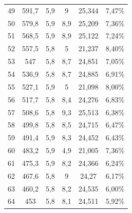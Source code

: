 \begin{longtable}{cccccc}
  49          & 591,7                & 5,9           & 9              & 25,344        & 7,47\%                             \\
  50          & 579,8                & 5,9           & 8,9            & 25,209        & 7,36\%                             \\
  51          & 568,5                & 5,9           & 8,9            & 25,122        & 7,24\%                             \\
  52          & 557,5                & 5,8           & 5              & 21,237        & 8,40\%                             \\
  53          & 547                  & 5,8           & 8,7            & 24,851        & 7,05\%                             \\
  54          & 536,9                & 5,8           & 8,7            & 24,885        & 6,91\%                             \\
  55          & 527,1                & 5,9           & 5              & 21,098        & 8,00\%                             \\
  56          & 517,7                & 5,8           & 8,4            & 24,276        & 6,83\%                             \\
  57          & 508,6                & 5,8           & 9,3            & 25,513        & 6,38\%                             \\
  58          & 499,8                & 5,8           & 8,5            & 24,715        & 6,47\%                             \\
  59          & 491,4                & 5,9           & 8,3            & 24,452        & 6,43\%                             \\
  60          & 483,2                & 5,9           & 4,9            & 21,005        & 7,36\%                             \\
  61          & 475,3                & 5,9           & 8,2            & 24,366        & 6,24\%                             \\
  62          & 467,6                & 5,8           & 9              & 24,27         & 6,17\%                             \\
  63          & 460,2                & 5,8           & 8,2            & 24,535        & 6,00\%                             \\
  64          & 453                  & 5,8           & 8,1            & 24,511        & 5,92\%                             \\

\end{longtable}

